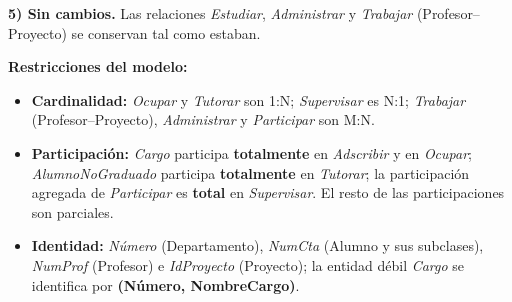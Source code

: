\textbf{5) Sin cambios.} Las relaciones \textit{Estudiar}, \textit{Administrar} y \textit{Trabajar} (Profesor--Proyecto) se conservan tal como estaban.

\textbf{Restricciones del modelo:}
\begin{itemize}
	\item \textbf{Cardinalidad:} \textit{Ocupar} y \textit{Tutorar} son 1:N; \textit{Supervisar} es N:1; \textit{Trabajar} (Profesor--Proyecto), \textit{Administrar} y \textit{Participar} son M:N.
	\item \textbf{Participación:} \textit{Cargo} participa \textbf{totalmente} en \textit{Adscribir} y en \textit{Ocupar}; \textit{AlumnoNoGraduado} participa \textbf{totalmente} en \textit{Tutorar}; la participación agregada de \textit{Participar} es \textbf{total} en \textit{Supervisar}. El resto de las participaciones son parciales.
	\item \textbf{Identidad:} \textit{Número} (Departamento), \textit{NumCta} (Alumno y sus subclases), \textit{NumProf} (Profesor) e \textit{IdProyecto} (Proyecto); la entidad débil \textit{Cargo} se identifica por \textbf{(Número, NombreCargo)}.
\end{itemize}
